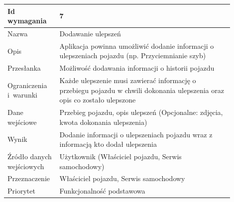 \documentclass[12pt]{article}
\begin{document}
\begin{table}[H]
\begin{center}
	\begin{tabular}{|p{0.18\linewidth}|p{0.72\linewidth}|}%
	\hline
	Id wymagania 	& 7 				\\ \hline
	Nazwa			& Dodawanie ulepszeń
 \\ \hline
	Opis &	Aplikacja powinna umożliwić dodanie informacji o ulepszeniach pojazdu (np. Przyciemnianie szyb)\\ \hline
	Przesłanka & Możliwość dodawania informacji o historii pojazdu  \\ \hline
	Ograniczenia i~warunki & Każde ulepszenie musi zawierać informację o przebiegu pojazdu w chwili dokonania ulepszenia oraz opis co zostało ulepszone \\ \hline
	Dane wejściowe &Przebieg pojazdu, opis ulepszeń
(Opcjonalne: zdjęcia, kwota dokonania ulepszenia) \\ \hline
	Wynik & Dodanie informacji o ulepszeniach pojazdu wraz z informacją kto dodał ulepszenia\\ \hline
	Źródło danych wejściowych &Użytkownik (Właściciel pojazdu, Serwis samochodowy)\\ \hline
	Przeznaczenie &Właściciel pojazdu, Serwis samochodowy\\ \hline
	Priorytet & Funkcjonalność podstawowa \\ \hline
	\end{tabular}
\end{center}
\end{table}
\end{document}
